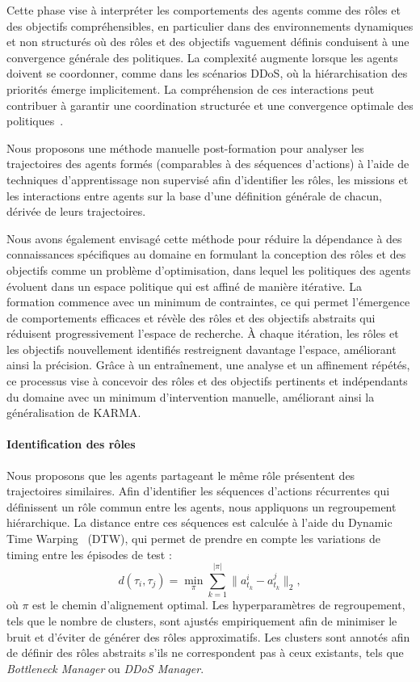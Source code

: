 Cette phase vise à interpréter les comportements des agents comme des rôles et des objectifs compréhensibles, en particulier dans des environnements dynamiques et non structurés où des rôles et des objectifs vaguement définis conduisent à une convergence générale des politiques. La complexité augmente lorsque les agents doivent se coordonner, comme dans les scénarios DDoS, où la hiérarchisation des priorités émerge implicitement. La compréhension de ces interactions peut contribuer à garantir une coordination structurée et une convergence optimale des politiques~\cite{Shoham2009MAS}.

Nous proposons une méthode manuelle post-formation pour analyser les trajectoires des agents formés (comparables à des séquences d'actions) à l'aide de techniques d'apprentissage non supervisé afin d'identifier les rôles, les missions et les interactions entre agents sur la base d'une définition générale de chacun, dérivée de leurs trajectoires.

Nous avons également envisagé cette méthode pour réduire la dépendance à des connaissances spécifiques au domaine en formulant la conception des rôles et des objectifs comme un problème d'optimisation, dans lequel les politiques des agents évoluent dans un espace politique qui est affiné de manière itérative. La formation commence avec un minimum de contraintes, ce qui permet l'émergence de comportements efficaces et révèle des rôles et des objectifs abstraits qui réduisent progressivement l'espace de recherche. À chaque itération, les rôles et les objectifs nouvellement identifiés restreignent davantage l'espace, améliorant ainsi la précision. Grâce à un entraînement, une analyse et un affinement répétés, ce processus vise à concevoir des rôles et des objectifs pertinents et indépendants du domaine avec un minimum d'intervention manuelle, améliorant ainsi la généralisation de KARMA.

\paragraph*{\textbf{Identification des rôles}}

Nous proposons que les agents partageant le même rôle présentent des trajectoires similaires. Afin d'identifier les séquences d'actions récurrentes qui définissent un rôle commun entre les agents, nous appliquons un regroupement hiérarchique. La distance entre ces séquences est calculée à l'aide du Dynamic Time Warping~\cite{berndt1994using} (DTW), qui permet de prendre en compte les variations de timing entre les épisodes de test :
\[
d(\tau_i, \tau_j) = \min_{\pi} \sum_{k=1}^{|\pi|} \|a_{t_k}^i - a_{t_k}^j\|_2,
\]
où $\pi$ est le chemin d'alignement optimal. Les hyperparamètres de regroupement, tels que le nombre de clusters, sont ajustés empiriquement afin de minimiser le bruit et d'éviter de générer des rôles approximatifs. Les clusters sont annotés afin de définir des rôles abstraits s'ils ne correspondent pas à ceux existants, tels que \textit{Bottleneck Manager} ou \textit{DDoS Manager}.


